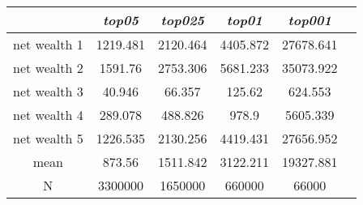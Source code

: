 \begin{tabular}{cccccc}
\hline \textit{}&      \textit{top05}& \textit{top025}&        \textit{top01}& \textit{top001}\\ \hline
net wealth 1&1219.481&2120.464&4405.872&27678.641\\
net wealth 2&1591.76&2753.306&5681.233&35073.922\\
net wealth 3&40.946&66.357&125.62&624.553\\
net wealth 4&289.078&488.826&978.9&5605.339\\
net wealth 5&1226.535&2130.256&4419.431&27656.952\\
mean&873.56&1511.842&3122.211&19327.881\\
N&3300000&1650000&660000&66000\\
\hline \end{tabular}
